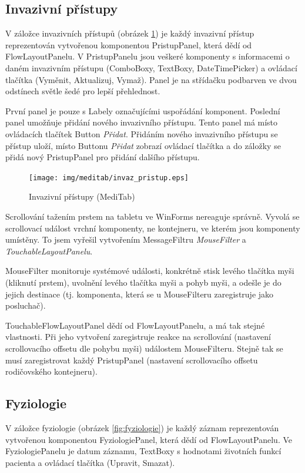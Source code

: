 \subsection{Invazivní přístupy}
\label{sec:pristup}

V záložce invazivních přístupů (obrázek \ref{fig:invaz_pristup}) je každý invazivní přístup reprezentován vytvořenou komponentou PristupPanel, která dědí od FlowLayoutPanelu. V PristupPanelu jsou veškeré komponenty s informacemi o daném invazivním přístupu (ComboBoxy, TextBoxy, DateTimePicker) a ovládací tlačítka (Vyměnit, Aktualizuj, Vymaž). Panel je na střídačku podbarven ve dvou odstínech světle šedé pro lepší přehlednost.

První panel je pouze s Labely označujícími uspořádání komponent. Poslední panel umožňuje přidání nového invazivního přístupu. Tento panel má místo ovládacích tlačítek Button \emph{Přidat}. Přidáním nového invazivního přístupu se přístup uloží, místo Buttonu \emph{Přidat} zobrazí ovládací tlačítka a do záložky se přidá nový PristupPanel pro přidání dalšího přístupu.

\begin{figure}[H]
	\centering
	\texttt{[image: img/meditab/invaz\_pristup.eps]}
	\caption{Invazivní přístupy (MediTab)}
  \label{fig:invaz_pristup}
\end{figure}

Scrollování tažením prstem na tabletu ve WinForms nereaguje správně. Vyvolá se scrollovací událost vrchní komponenty, ne kontejneru, ve kterém jsou komponenty umístěny. To jsem vyřešil vytvořením MessageFiltru \emph{MouseFilter} a \emph{TouchableLayoutPanelu}.

MouseFilter monitoruje systémové události, konkrétně stisk levého tlačítka myši (kliknutí prstem), uvolnění levého tlačítka myši a pohyb myši, a odešle je do jejich destinace (tj. komponenta, která se u MouseFilteru zaregistruje jako posluchač). 

TouchableFlowLayoutPanel dědí od FlowLayoutPanelu, a má tak stejné vlastnosti. Při jeho vytvoření zaregistruje reakce na scrollování (nastavení scrollovacího offsetu dle pohybu myši) událostem MouseFilteru. Stejně tak se musí zaregistrovat každý PristupPanel (nastavení scrollovacího offsetu rodičovského kontejneru).


\subsection{Fyziologie}

V záložce fyziologie (obrázek \ref{fig:fyziologie}) je každý záznam reprezentován vytvořenou komponentou FyziologiePanel, která dědí od FlowLayoutPanelu. Ve FyziologiePanelu je datum záznamu, TextBoxy s hodnotami životních funkcí pacienta a ovládací tlačítka (Upravit, Smazat).


